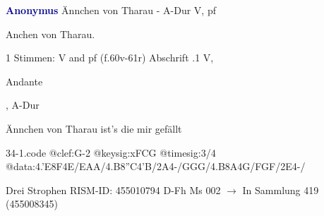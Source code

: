 \documentclass[twocolumn]{book}
\begin{document}
\newline \par \vspace{7pt} \textcolor{darkblue}{\textbf{Anonymus  }}
\newline Ännchen von Tharau - A-Dur
\newline V, pf
\newline \begin{itshape}[heading, f.60v:] Anchen von Tharau.\end{itshape} 
\newline \textcolor{darkblue}{}  1 Stimmen: V and pf  (f.60v-61r)
\newline Abschrift
.1  V, \begin{itshape}Andante\end{itshape}, A-Dur
\newline \begin{footnotesize} Ännchen von Tharau ist's die mir gefällt \end{footnotesize}  
\begin{filecontents*}{34-1.code}
@clef:G-2
@keysig:xFCG
@timesig:3/4
@data:4.'E8F4E/EAA/4.B8''C4'B/2A4-/GGG/4.B8A4G/FGF/2E4-/
\end{filecontents*}
\newline
%
\newline Drei Strophen
\newline RISM-ID: 455010794
\newline D-Fh  Ms 002
\newline $\rightarrow$ In Sammlung 419 (455008345)
      
\end{document}

